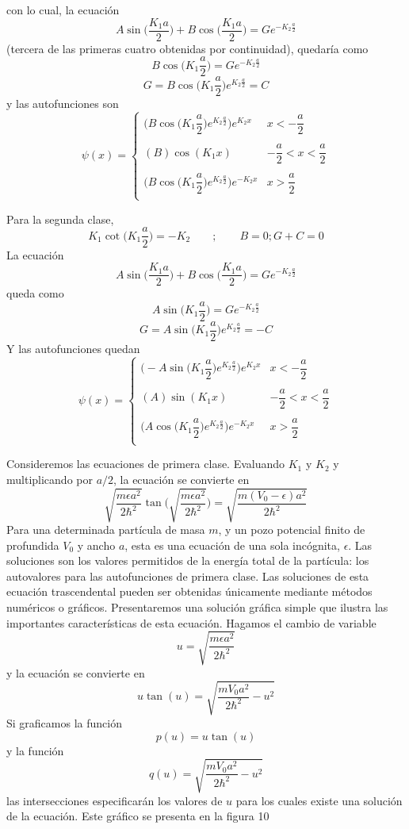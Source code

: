 \documentclass[12pt,a4paper]{article}
\def\e{{\epsilon}} %
\begin{document}
con lo cual, la ecuación
\[ A \sin \bigg( \frac{K_{1}a}{2} \bigg) + B \cos \bigg( \frac{K_{1}a}{2} \bigg)=Ge^{-K_{2}\frac{a}{2}} \]
(tercera de las primeras cuatro obtenidas por continuidad), quedaría como
\[ B \cos \bigg( K_{1}\frac{a}{2} \bigg)=Ge^{-K_{2}\frac{a}{2}} \]
\[ G= B \cos \bigg( K_{1}\frac{a}{2} \bigg)e^{K_{2}\frac{a}{2}}=C \]
y las autofunciones son
\[
\psi (x)=
\left\{
\begin{array}{ll}
\bigg( B \cos \bigg( K_{1}\dfrac{a}{2} \bigg)e^{K_{2}\frac{a}{2}} \bigg) e^{K_{2}x} & x<-\dfrac{a}{2} \\
 & \\
(B) \cos (K_{1}x) & -\dfrac{a}{2}<x<\dfrac{a}{2} \\
 & \\
\bigg( B \cos \bigg( K_{1}\dfrac{a}{2} \bigg)e^{K_{2}\frac{a}{2}} \bigg) e^{-K_{2}x} & x>\dfrac{a}{2} \\
\end{array}
\right.
\]

Para la segunda clase,
\[ K_{1} \cot \bigg( K_{1} \frac{a}{2} \bigg)=-K_{2} \qquad ; \qquad B=0;G+C=0 \]
La ecuación
\[ A \sin \bigg( \frac{K_{1}a}{2} \bigg) + B \cos \bigg( \frac{K_{1}a}{2} \bigg)=Ge^{-K_{2}\frac{a}{2}} \]
queda como
\[ A \sin \bigg( K_{1} \frac{a}{2} \bigg) = Ge^{-K_{2}\frac{a}{2}} \]
\[ G=A \sin \bigg( K_{1} \frac{a}{2} \bigg)e^{K_{2}\frac{a}{2}}=-C \]
Y las autofunciones quedan
\[
\psi (x)=
\left\{
\begin{array}{ll}
\bigg( -A \sin \bigg( K_{1}\dfrac{a}{2} \bigg)e^{K_{2}\frac{a}{2}} \bigg) e^{K_{2}x} & x<-\dfrac{a}{2} \\
 & \\
(A) \sin (K_{1}x) & -\dfrac{a}{2}<x<\dfrac{a}{2} \\
 & \\
\bigg( A \cos \bigg( K_{1}\dfrac{a}{2} \bigg)e^{K_{2}\frac{a}{2}} \bigg) e^{-K_{2}x} & x>\dfrac{a}{2} \\
\end{array}
\right.
\]

Consideremos las ecuaciones de primera clase. Evaluando $K_{1}$ y $K_{2}$ y multiplicando por $a/2$, la ecuación se convierte en
\[ \sqrt{\frac{m\e a^{2}}{2\hbar^{2}}} \tan \bigg( \sqrt{\frac{m \e a^{2}}{2\hbar^{2}}} \bigg)=\sqrt{\frac{m(V_{0}-\e)a^{2}}{2\hbar^{2}}} \]
Para una determinada partícula de masa $m$, y un pozo potencial finito de profundida $V_{0}$ y ancho $a$, esta es una ecuación de una sola incógnita, $\e$. Las soluciones son los valores permitidos de la energía total de la partícula: los autovalores para las autofunciones de primera clase. Las soluciones de esta ecuación trascendental pueden ser obtenidas únicamente mediante métodos numéricos o gráficos. Presentaremos una solución gráfica simple que ilustra las importantes características de esta ecuación. Hagamos el cambio de variable
\[ u=\sqrt{\frac{m \e a^{2}}{2\hbar^{2}}} \]
y la ecuación se convierte en
\[ u \tan (u)= \sqrt{\frac{mV_{0}a^{2}}{2\hbar^{2}}-u^{2}} \]
Si graficamos la función
\[ p(u)=u \tan(u) \]
y la función
\[ q(u)=\sqrt{\frac{mV_{0}a^{2}}{2\hbar^{2}}-u^{2}} \]
las intersecciones especificarán los valores de $u$ para los cuales existe una solución de la ecuación. Este gráfico se presenta en la figura 10
\end{document}
